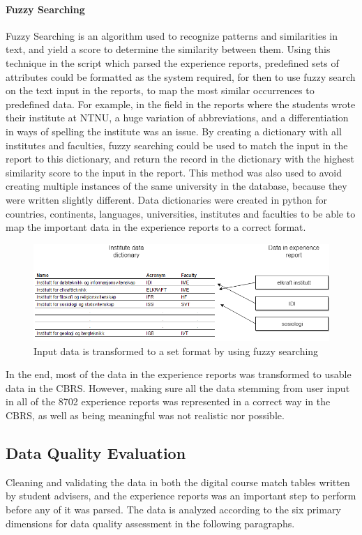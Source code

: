 \paragraph{Fuzzy Searching}
Fuzzy Searching is an algorithm used to recognize patterns and similarities in text, and yield a score to determine the similarity between them. Using this technique in the script which parsed the experience reports, predefined sets of attributes could be formatted as the system required, for then to use fuzzy search on the text input in the reports, to map the most similar occurrences to predefined data. For example, in the field in the reports where the students wrote their institute at NTNU, a huge variation of abbreviations, and a differentiation in ways of spelling the institute was an issue. By creating a dictionary with all institutes and faculties, fuzzy searching could be used to match the input in the report to this dictionary, and return the record in the dictionary with the highest similarity score to the input in the report. This method was also used to avoid creating multiple instances of the same university in the database, because they were written slightly different. Data dictionaries were created in python for countries, continents, languages, universities, institutes and faculties to be able to map the important data in the experience reports to a correct format.

\begin{figure}[h]
    \centering
    \includegraphics[width=1.0\textwidth]{fig/fuzzy_searching.png}
    \caption{Input data is transformed to a set format by using fuzzy searching}
    \label{fig:fuzzy_searching}
\end{figure}

In the end, most of the data in the experience reports was transformed to usable data in the CBRS. However, making sure all the data stemming from user input in all of the 8702 experience reports was represented in a correct way in the CBRS, as well as being meaningful was not realistic nor possible. 

\subsection{Data Quality Evaluation}
Cleaning and validating the data in both the digital course match tables written by student advisers, and the experience reports was an important step to perform before any of it was parsed. The data is analyzed according to the six primary dimensions for data quality assessment\cite{askham2013six} in the following paragraphs.

